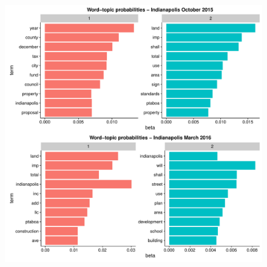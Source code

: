 \documentclass[11pt]{article}
\begin{document}
\begin{figure}[!ht]
	\centering
	\includegraphics[width=\linewidth]{figures/wtpIndy.pdf}
\end{figure}

\newpage



\end{document}

